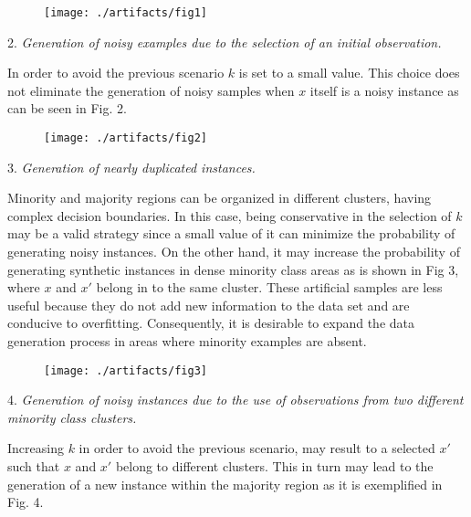 \documentclass[parskip=full]{scrartcl}
\begin{document}
\begin{figure}[H]
	\centering
	\texttt{[image: ./artifacts/fig1]}
\end{figure}

2. \textit{Generation of noisy examples due to the selection of an initial
observation.}

In order to avoid the previous scenario \( k \) is set to a small value. This
choice does not eliminate the generation of noisy samples when \( x \) itself is
a noisy instance as can be seen in Fig. 2.

\begin{figure}[H]
	\centering
	\texttt{[image: ./artifacts/fig2]}
\end{figure}

3. \textit{Generation of nearly duplicated instances.}

Minority and majority regions can be organized in different clusters, having
complex decision boundaries.  In this case, being conservative in the selection
of \( k \) may be a valid strategy since a small value of it can minimize the
probability of generating noisy instances. On the other hand, it may increase
the probability of generating synthetic instances in dense minority class areas
as is shown in Fig 3, where \(x\) and \(x'\) belong in to the same cluster.
These artificial samples are less useful because they do not add new information
to the data set and are conducive to overfitting. Consequently, it is desirable
to expand the data generation process in areas where minority examples are
absent.

\begin{figure}[H]
	\centering
	\texttt{[image: ./artifacts/fig3]}
	\end{figure}

4. \textit{Generation of noisy instances due to the use of observations from two
different minority class clusters.}

Increasing \( k \)  in order to avoid the previous scenario,  may result to a
selected \( x' \) such that \( x \) and \( x' \) belong to different clusters.
This in turn may lead to the generation of a new instance within the majority
region as it is exemplified in Fig. 4. 
\end{document}
